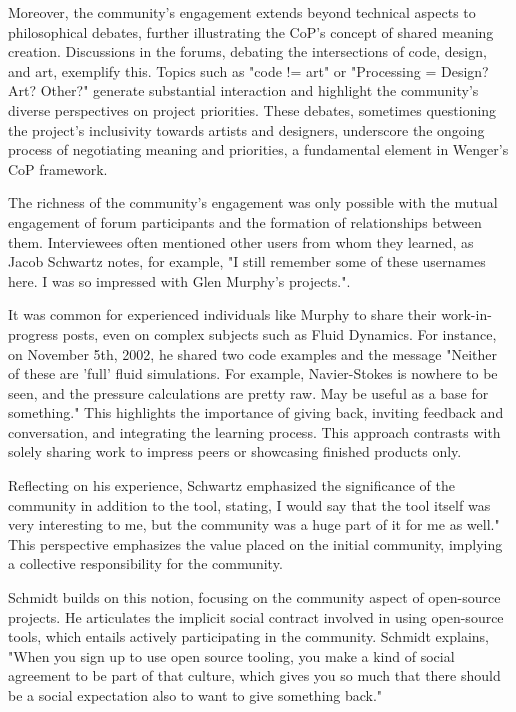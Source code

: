 Moreover, the community's engagement extends beyond technical aspects to philosophical debates, further illustrating the CoP's concept of shared meaning creation. Discussions in the forums, debating the intersections of code, design, and art, exemplify this. Topics such as "code != art" or "Processing = Design? Art? Other?" generate substantial interaction and highlight the community's diverse perspectives on project priorities. These debates, sometimes questioning the project's inclusivity towards artists and designers, underscore the ongoing process of negotiating meaning and priorities, a fundamental element in Wenger's CoP framework.

The richness of the community's engagement was only possible with the mutual engagement of forum participants and the formation of relationships between them.  Interviewees often mentioned other users from whom they learned, as Jacob Schwartz notes, for example, "I still remember some of these usernames here. I was so impressed with Glen Murphy's projects.". 

It was common for experienced individuals like Murphy to share their work-in-progress posts, even on complex subjects such as Fluid Dynamics. For instance, on November 5th, 2002, he shared two code examples and the message "Neither of these are 'full' fluid simulations. For example, Navier-Stokes is nowhere to be seen, and the pressure calculations are pretty raw. May be useful as a base for something." This highlights the importance of giving back, inviting feedback and conversation, and integrating the learning process. This approach contrasts with solely sharing work to impress peers or showcasing finished products only.

Reflecting on his experience, Schwartz emphasized the significance of the community in addition to the tool, stating, I would say that the tool itself was very interesting to me, but the community was a huge part of it for me as well." This perspective emphasizes the value placed on the initial community, implying a collective responsibility for the community.

Schmidt builds on this notion, focusing on the community aspect of open-source projects. He articulates the implicit social contract involved in using open-source tools, which entails actively participating in the community. Schmidt explains, "When you sign up to use open source tooling, you make a kind of social agreement to be part of that culture, which gives you so much that there should be a social expectation also to want to give something back."

